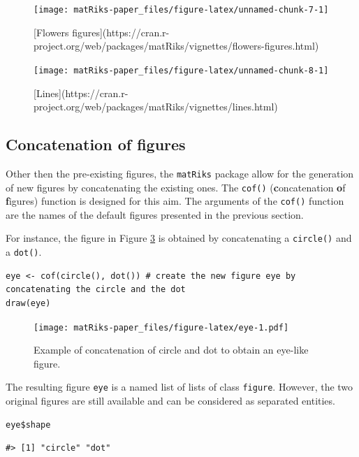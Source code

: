 \begin{figure}
\texttt{[image: matRiks-paper\_files/figure-latex/unnamed-chunk-7-1]} \caption{[Flowers figures](https://cran.r-project.org/web/packages/matRiks/vignettes/flowers-figures.html)}\label{fig:unnamed-chunk-7}
\end{figure}

\begin{figure}
\texttt{[image: matRiks-paper\_files/figure-latex/unnamed-chunk-8-1]} \caption{[Lines](https://cran.r-project.org/web/packages/matRiks/vignettes/lines.html)}\label{fig:unnamed-chunk-8}
\end{figure}

\hypertarget{concatenation-of-figures}{%
\subsection{Concatenation of figures}\label{concatenation-of-figures}}

Other then the pre-existing figures, the \texttt{matRiks} package allow for the generation of new figures by concatenating the existing ones. The \texttt{cof()} (\textbf{c}oncatenation \textbf{o}f \textbf{f}igures) function is designed for this aim. The arguments of the \texttt{cof()} function are the names of the default figures presented in the previous section.

For instance, the figure in Figure \ref{fig:eye} is obtained by concatenating a \texttt{circle()} and a \texttt{dot()}.

\begin{verbatim}
eye <- cof(circle(), dot()) # create the new figure eye by concatenating the circle and the dot
draw(eye)
\end{verbatim}

\begin{figure}
\centering
\texttt{[image: matRiks-paper\_files/figure-latex/eye-1.pdf]}
\caption{\label{fig:eye}Example of concatenation of circle and dot to obtain an eye-like figure.}
\end{figure}

The resulting figure \texttt{eye} is a named list of lists of class \texttt{figure}. However, the two original figures are still available and can be considered as separated entities.

\begin{verbatim}
eye$shape
\end{verbatim}

\begin{verbatim}
#> [1] "circle" "dot"
\end{verbatim}

